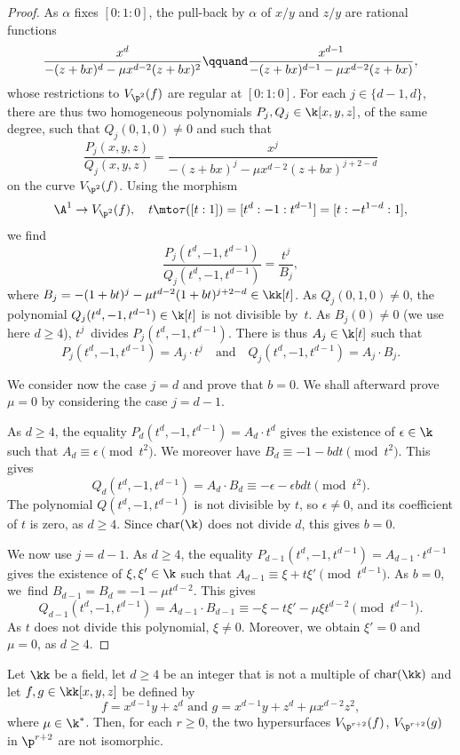 \begin{proof}
As $\alpha$ fixes $[0:1:0]$, the pull-back by $\alpha$ of $x/y$ and $z/y$ are rational functions
\[
\frac{x^d}{-(z+bx)^d-\mu x^{d-2}(z+bx)^2} \qquand
\frac{x^{d-1}}{-(z+bx)^{d-1}-\mu x^{d-2}(z+bx)},
\]
whose restrictions to $V_{\p^2}(f)$ are regular at $[0:1:0]$. For each $j\in \{d-1,d\}$, there are thus two homogeneous polynomials $P_j,Q_j\in\k[x,y,z]$, of the same degree, such that $Q_j(0,1,0)\neq 0$ and such that \[\frac{P_j(x,y,z)}{Q_j(x,y,z)}=\frac{x^{j}}{-(z+bx)^{j}-\mu x^{d-2}(z+bx)^{j+2-d}}\] on the curve $V_{\p^2}(f)$. Using the morphism
\[
\A^1\to V_{\p^2}(f), \quad t\mto \tau([t:1])=[t^d:-1:t^{d-1}]=[t:-t^{1-d}:1],
\]
we find
\[
\frac{P_j(t^d,-1,t^{d-1})}{Q_j(t^d,-1,t^{d-1})}=\frac{t^{j}}{B_j},
\]
where $B_j = -(1+bt)^{j}-\mu t^{d-2}(1+bt)^{j+2-d} \in \kk[t]$.
As $Q_j(0,1,0)\neq 0$, the polynomial $Q_j(t^d,-1,t^{d-1})\in \k[t]$ is not divisible by~$t$. As $B_j(0) \neq 0$
(we use here $d \geq 4$), $t^j$~divides $P_j(t^d,-1,t^{d-1})$. There is thus $A_j\in \k[t]$ such that
\[
P_j(t^d,-1,t^{d-1})=A_j\cdot t^j \quad \text{and} \quad Q_j(t^d,-1,t^{d-1})=A_j\cdot B_j.
\]

We consider now the case $j=d$ and prove that $b=0$. We shall afterward prove $\mu=0$ by considering the case $j=d-1$.

As $d\ge 4$, the equality $P_d(t^d,-1,t^{d-1})=A_d\cdot t^d$ gives the existence of $\epsilon\in \k$ such that $A_d\equiv \epsilon \pmod{t^{2}}$. We moreover have $B_d\equiv -1-bdt \pmod{t^2}$. This gives
\[Q_d(t^d,-1,t^{d-1})=A_d\cdot B_d\equiv -\epsilon -\epsilon bdt \pmod{t^2}.\]
The polynomial $Q(t^d,-1,t^{d-1})$ is not divisible by $t$, so $\epsilon\neq 0$, and its coefficient of $t$ is zero, as $d\ge 4$. Since $\mathrm{char}(\k)$ does not divide $d$, this gives $b=0$.

We now use $j=d-1$. As $d\ge 4$, the equality $P_{d-1}(t^d,-1,t^{d-1})=A_{d-1}\cdot t^{d-1}$ gives the existence of $\xi,\xi'\in \k$ such that $A_{d-1}\equiv \xi+t \xi' \pmod{t^{d-1}}$. As $b=0$, we~find $B_{d-1}=B_d=-1-\mu t^{d-2}$. This gives
\[Q_{d-1}(t^d,-1,t^{d-1})=A_{d-1}\cdot B_{d-1}\equiv -\xi-t \xi'-\mu\xi t^{d-2} \pmod{t^{d-1}}.\]
As $t$ does not divide this polynomial, $\xi\neq0$. Moreover, we obtain $\xi'=0$ and $\mu=0$, as $d\ge 4$.
\end{proof}

\begin{proposition}\label{Prop.IsoHypNN3}
Let $\kk$ be a field, let $d\ge 4$ be an integer that is not a multiple of $\mathrm{char}(\kk)$ and let $f,g\in\kk[x,y,z]$ be defined by \[f=x^{d-1}y+z^{d} \text{ and } g=x^{d-1}y+z^{d}+\mu x^{d-2}z^2,\] where $\mu\in \k^*$. Then, for each $r\ge 0$, the two hypersurfaces $V_{\p^{r+2}}(f)$, $V_{\p^{r+2}}(g)$ in $\p^{r+2}$ are not isomorphic.
\end{proposition}

